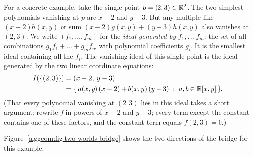 For a concrete example, take the single point $p = (2, 3) \in \mathbb{R}^2$. The two simplest polynomials vanishing at $p$ are $x - 2$ and $y - 3$. But any multiple like $(x-2)h(x, y)$ or sum $(x-2)g(x, y) + (y-3)h(x, y)$ also vanishes at $(2, 3)$. We write $(f_1, \dots, f_m)$ for the \emph{ideal generated by} $f_1, \dots, f_m$: the set of all combinations $g_1 f_1 + \dots + g_m f_m$ with polynomial coefficients $g_i$. It is the smallest ideal containing all the $f_i$. The vanishing ideal of this single point is the ideal generated by the two linear coordinate equations:
\begin{align*}
I(\{(2, 3)\}) &= (x - 2,\; y - 3)\\
&= \{\, a(x, y)\,(x - 2) + b(x, y)\,(y - 3) \;:\; a, b \in \mathbb{R}[x, y] \,\}.
\end{align*}
(That every polynomial vanishing at $(2,3)$ lies in this ideal takes a short argument: rewrite $f$ in powers of $x-2$ and $y-3$; every term except the constant contains one of these factors, and the constant term equals $f(2,3) = 0$.)

Figure~\ref{alggeom:fig-two-worlds-bridge} shows the two directions of the bridge for this example.

